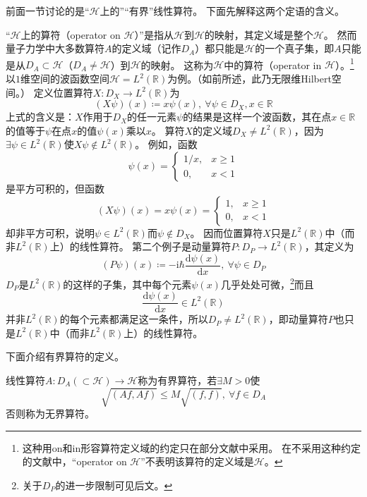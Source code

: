 前面一节讨论的是``$\mathscr{H}$上的''``有界''线性算符。
下面先解释这两个定语的含义。

``$\mathscr{H}$上的算符（operator on $\mathscr{H}$）''是指从$\mathscr{H}$到$\mathscr{H}$的映射，其定义域是整个$\mathscr{H}$。
然而量子力学中大多数算符$A$的定义域（记作$D_A$）都只能是$\mathscr{H}$的一个真子集，即$A$只能是从$D_A \subset \mathscr{H}$（$D_A \neq \mathscr{H}$）到$\mathscr{H}$的映射。
这称为$\mathscr{H}$中的算符（operator in $\mathscr{H}$）。\footnote{
    这种用on和in形容算符定义域的约定只在部分文献中采用。
    在不采用这种约定的文献中，``operator on $\mathscr{H}$''不表明该算符的定义域是$\mathscr{H}$。
}以$1$维空间的波函数空间$\mathscr{H} = L^2(\mathbb{R})$为例。（如前所述，此乃无限维Hilbert空间。）
定义位置算符$X \colon D_X \to L^2(\mathbb{R})$为
$$(X\psi)(x) \coloneq x\psi(x), ~ \forall \psi \in D_X, x \in \mathbb{R}$$
上式的含义是：$X$作用于$D_X$的任一元素$\psi$的结果是这样一个波函数，其在点$x \in \mathbb{R}$的值等于$\psi$在点$x$的值$\psi(x)$乘以$x$。
算符$X$的定义域$D_X \neq L^2(\mathbb{R})$，因为$\exists \psi \in L^2(\mathbb{R})$使$X\psi \notin L^2(\mathbb{R})$。
例如，函数
\[\psi(x) = \begin{cases}
    1 / x, & x \geq 1 \\
    0, & x < 1
\end{cases}\]
是平方可积的，但函数
\[(X\psi)(x) = x\psi(x) = \begin{cases}
    1, & x \geq 1 \\
    0, & x < 1
\end{cases}\]
却非平方可积，说明$\psi \in L^2(\mathbb{R})$而$\psi \notin D_X$。
因而位置算符$X$只是$L^2(\mathbb{R})$中（而非$L^2(\mathbb{R})$上）的线性算符。
第二个例子是动量算符$P \colon D_P \to L^2(\mathbb{R})$，其定义为
$$(P\psi)(x) \coloneq -\mathrm{i}\hbar\frac{\mathrm{d}\psi(x)}{\mathrm{d}x}, ~ \forall \psi \in D_P$$
$D_P$是$L^2(\mathbb{R})$的这样的子集，其中每个元素$\psi(x)$几乎处处可微，\footnote{
    关于$D_P$的进一步限制可见后文。
}而且
$$\frac{\mathrm{d}\psi(x)}{\mathrm{d}x} \in L^2(\mathbb{R})$$
并非$L^2(\mathbb{R})$的每个元素都满足这一条件，所以$D_P \neq L^2(\mathbb{R})$，即动量算符$P$也只是$L^2(\mathbb{R})$中（而非$L^2(\mathbb{R})$上）的线性算符。

下面介绍有界算符的定义。

\begin{definition}
    线性算符$A \colon D_A(\subset \mathscr{H}) \to \mathscr{H}$称为有界算符，若$\exists M > 0$使
    $$\sqrt{(Af, Af)} \leq M\sqrt{(f, f)}, ~ \forall f \in D_A$$
    否则称为无界算符。
\end{definition}

